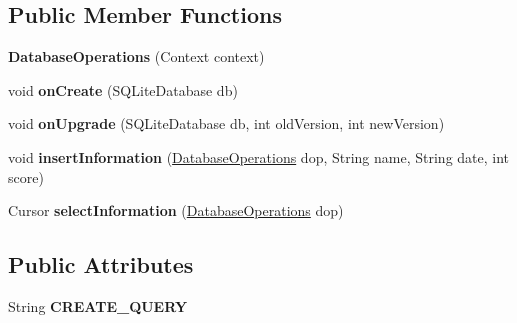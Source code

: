 \subsection*{Public Member Functions}
\begin{DoxyCompactItemize}
\item 
{\bfseries Database\+Operations} (Context context)\hypertarget{classcom_1_1initi_1_1thierry_1_1colormatchapp__v02_1_1_database_operations_a8c4fe0ff81536dd697c1fd6c959155e3}{}\label{classcom_1_1initi_1_1thierry_1_1colormatchapp__v02_1_1_database_operations_a8c4fe0ff81536dd697c1fd6c959155e3}

\item 
void {\bfseries on\+Create} (S\+Q\+Lite\+Database db)\hypertarget{classcom_1_1initi_1_1thierry_1_1colormatchapp__v02_1_1_database_operations_a95c099d7c28a99c8c11fd9c2d082c371}{}\label{classcom_1_1initi_1_1thierry_1_1colormatchapp__v02_1_1_database_operations_a95c099d7c28a99c8c11fd9c2d082c371}

\item 
void {\bfseries on\+Upgrade} (S\+Q\+Lite\+Database db, int old\+Version, int new\+Version)\hypertarget{classcom_1_1initi_1_1thierry_1_1colormatchapp__v02_1_1_database_operations_a357371e4b1022b4a6d836409740a8d44}{}\label{classcom_1_1initi_1_1thierry_1_1colormatchapp__v02_1_1_database_operations_a357371e4b1022b4a6d836409740a8d44}

\item 
void {\bfseries insert\+Information} (\hyperlink{classcom_1_1initi_1_1thierry_1_1colormatchapp__v02_1_1_database_operations}{Database\+Operations} dop, String name, String date, int score)\hypertarget{classcom_1_1initi_1_1thierry_1_1colormatchapp__v02_1_1_database_operations_a75a93524f17e97642023dcc5cf248edb}{}\label{classcom_1_1initi_1_1thierry_1_1colormatchapp__v02_1_1_database_operations_a75a93524f17e97642023dcc5cf248edb}

\item 
Cursor {\bfseries select\+Information} (\hyperlink{classcom_1_1initi_1_1thierry_1_1colormatchapp__v02_1_1_database_operations}{Database\+Operations} dop)\hypertarget{classcom_1_1initi_1_1thierry_1_1colormatchapp__v02_1_1_database_operations_a30f87ef90139e07d6def8d1fd9919fa1}{}\label{classcom_1_1initi_1_1thierry_1_1colormatchapp__v02_1_1_database_operations_a30f87ef90139e07d6def8d1fd9919fa1}

\end{DoxyCompactItemize}
\subsection*{Public Attributes}
\begin{DoxyCompactItemize}
\item 
String {\bfseries C\+R\+E\+A\+T\+E\+\_\+\+Q\+U\+E\+RY}
\end{DoxyCompactItemize}
